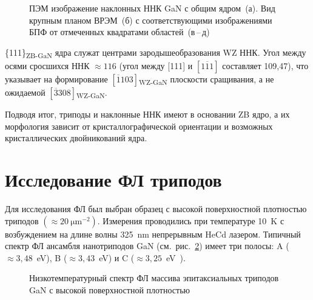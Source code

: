 \begin{figure}[ht]  \caption{ПЭМ
				изображение наклонных ННК GaN с общим ядром~(а). Вид крупным планом
				ВРЭМ~(б) с соответствующими изображениями БПФ от отмеченных квадратами
		областей~(в\,--\,д)}\label{fig:Image_18} \end{figure}

\{111\}\textsubscript{ZB-GaN} ядра служат центрами зародышеобразования WZ ННК.
Угол между осями сросшихся ННК \(\approx 116\){\textdegree} (угол между [111] и
\([\overline{111}]\) составляет 109,47\textdegree), что указывает на
формирование \([\overline{1}103]\)\textsubscript{WZ-GaN} плоскости сращивания,
а не ожидаемой \([\overline{3}308]\)\textsubscript{WZ-GaN}.

Подводя итог, триподы и наклонные ННК имеют в основании ZB ядро, а их
морфология зависит от кристаллографической ориентации и возможных
кристаллических двойникований ядра.

\section{Исследование ФЛ триподов}\label{sec:ch3/sec4}

Для исследования ФЛ был выбран образец с высокой поверхностной плотностью
триподов \((\approx 20~\si{\micro\meter^{-2}})\). Измерения проводились при
температуре 10~\si{\kelvin} с возбуждением на длине волны 325~\si{\nano\meter}
непрерывным HeCd лазером. Типичный спектр ФЛ ансамбля нанотриподов GaN
(см.~рис.~\cref{fig:Image_19}) имеет три полосы: A (\(\approx
3,48\)~\si{\electronvolt}), B (\(\approx 3,43\)~\si{\electronvolt}) и C
(\(\approx 3,25\)~\si{\electronvolt)}.

\begin{figure}[ht]   \caption{Низкотемпературный спектр ФЛ
		массива эпитаксиальных триподов GaN с высокой поверхностной
плотностью}\label{fig:Image_19} \end{figure}

